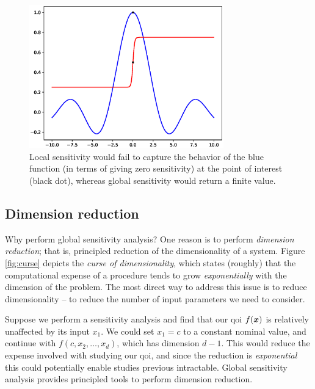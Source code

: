 \documentclass[../primer.tex]{subfiles}
\begin{document}
\begin{figure}[!ht]
  \centering\includegraphics[width=0.75\textwidth]{./images/ex1}
  \caption{Local sensitivity would fail to capture the behavior of the blue
  function (in terms of giving zero sensitivity) at the point of interest (black dot),
  whereas global sensitivity would return a finite value.}
  \label{fig:ex1}
\end{figure}

\subsection{Dimension reduction}
\label{sec:orga5b0484}
Why perform global sensitivity analysis? One reason is to perform \emph{dimension
reduction}; that is, principled reduction of the dimensionality of a system.
Figure \ref{fig:curse} depicts the \emph{curse of dimensionality}, which states
(roughly) that the computational expense of a procedure tends to grow
\emph{exponentially} with the dimension of the problem. The most direct way to
address this issue is to reduce dimensionality -- to reduce the number of input
parameters we need to consider.

Suppose we perform a sensitivity analysis and find that our qoi \(f(\boldsymbol{x})\) is
relatively unaffected by its input \(x_1\). We could set \(x_1=c\) to a constant
nominal value, and continue with \(f(c,x_2,\dots,x_d)\), which has dimension
\(d-1\). This would reduce the expense involved with studying our qoi, and since
the reduction is \emph{exponential} this could potentially enable studies previous
intractable. Global sensitivity analysis provides principled tools to perform
dimension reduction.
\end{document}
